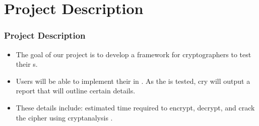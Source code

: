 \section{Project Description}


\begin{frame}
\frametitle{Project Description}
\begin{itemize}
\item The goal of our project is to develop a framework for
  cryptographers to test their \cs s.
\item Users will be able to implement their
  \cs{} in \cry. As the \cs{} is tested, cry will
  output a report that will outline certain details.
\item These details include: estimated time required to
  encrypt, decrypt, and crack the cipher using cryptanalysis
  .
\end{itemize}
\end{frame}
